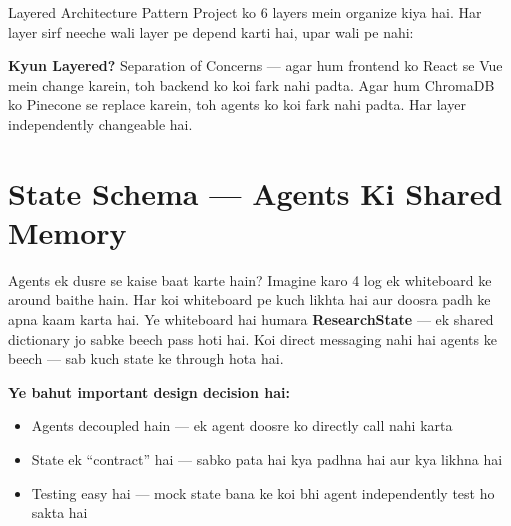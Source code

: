\documentclass[11pt,a4paper,twoside]{report}
\begin{document}
\begin{conceptbox}{Layered Architecture Pattern}
Project ko 6 layers mein organize kiya hai. Har layer sirf neeche wali layer pe depend karti hai, upar wali pe nahi:

\begin{center}
\end{center}

\textbf{Kyun Layered?} Separation of Concerns --- agar hum frontend ko React se Vue mein change karein, toh backend ko koi fark nahi padta. Agar hum ChromaDB ko Pinecone se replace karein, toh agents ko koi fark nahi padta. Har layer independently changeable hai.
\end{conceptbox}



\chapter{State Schema --- Agents Ki Shared Memory}

\begin{storybox}{Agents ek dusre se kaise baat karte hain?}
Imagine karo 4 log ek whiteboard ke around baithe hain. Har koi whiteboard pe kuch likhta hai aur doosra padh ke apna kaam karta hai. Ye whiteboard hai humara \textbf{ResearchState} --- ek shared dictionary jo sabke beech pass hoti hai. Koi direct messaging nahi hai agents ke beech --- sab kuch state ke through hota hai.

\textbf{Ye bahut important design decision hai:}
\begin{itemize}
    \item Agents decoupled hain --- ek agent doosre ko directly call nahi karta
    \item State ek ``contract'' hai --- sabko pata hai kya padhna hai aur kya likhna hai
    \item Testing easy hai --- mock state bana ke koi bhi agent independently test ho sakta hai
\end{itemize}
\end{storybox}
\end{document}
